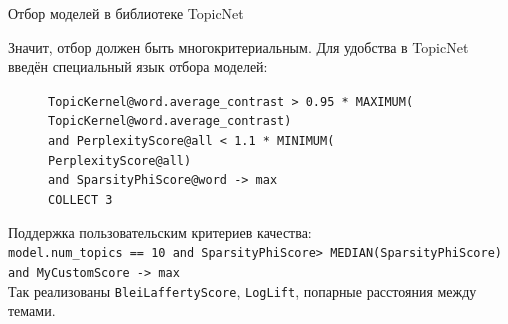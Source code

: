 \begin{frame}{Отбор моделей в библиотеке TopicNet}

Значит, отбор должен быть многокритериальным. Для удобства в TopicNet введён специальный язык отбора моделей:

\begin{figure}[ht]
\raggedright
\texttt{TopicKernel@word.average\_contrast > 0.95 * MAXIMUM( \\
\hphantom{\ \ \ \ \ \ \ \ }TopicKernel@word.average\_contrast) \\
\hphantom{\ \ } and PerplexityScore@all < 1.1 * MINIMUM( \\
\hphantom{\ \ \ \ \ \ \ \ }PerplexityScore@all) \\
\hphantom{\ \ } and SparsityPhiScore@word -> max\\
\hphantom{\ \ } COLLECT 3} \\
\label{DSL-example}
\end{figure} 
	

\bigskip
Поддержка пользовательским критериев качества:\\
\medskip
\texttt{model.num\_topics == 10 and SparsityPhiScore\@word > MEDIAN(SparsityPhiScore\@word) and MyCustomScore -> max}\\
\medskip
Так реализованы \texttt{BleiLaffertyScore}, \texttt{LogLift}, попарные расстояния между темами.
\end{frame}



